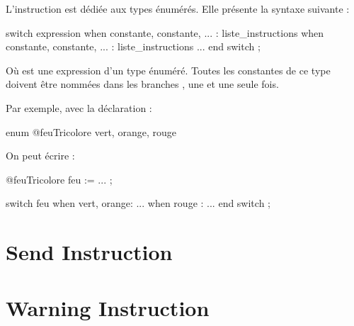 

















L'instruction  est dédiée aux types énumérés. Elle présente la syntaxe suivante :

\begin{galgascode}
switch expression
when constante, constante, ... :
  liste_instructions
when constante, constante, ... :
  liste_instructions
...
end switch ;
\end{galgascode}


Où  est une expression d'un type énuméré. Toutes les constantes de ce type doivent être nommées dans les branches , une et une seule fois.

Par exemple, avec la déclaration :

\begin{galgascode}
enum @feuTricolore {
  vert, orange, rouge   
}
\end{galgascode}

On peut écrire :

\begin{galgascode}
@feuTricolore feu := ... ;

switch feu
when vert, orange:
  ...
when rouge :
  ...
end switch ;
\end{galgascode}










\section{Send Instruction}




\section{Warning Instruction}


